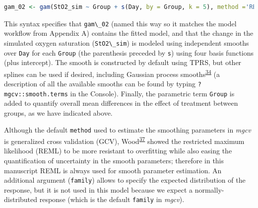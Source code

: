\documentclass[
]{article}
\newcommand{\passthrough}[1]{#1}
\begin{document}
\begin{lstlisting}[language=R]
gam_02 <- gam(StO2_sim ~ Group + s(Day, by = Group, k = 5), method ='REML', data = dat_sim)
\end{lstlisting}

This syntax specifies that \passthrough{\lstinline!gam\_02!} (named this way so it matches the model workflow from Appendix A) contains the fitted model, and that the change in the simulated oxygen saturation (\passthrough{\lstinline!StO2\_sim!}) is modeled using independent smooths over \passthrough{\lstinline!Day!} for each \passthrough{\lstinline!Group!} (the parenthesis preceded by \passthrough{\lstinline!s!}) using four basis functions (plus intercept). The smooth is constructed by default using TPRS, but other splines can be used if desired, including Gaussian process smooths\textsuperscript{\protect\hyperlink{ref-simpson2018}{34}} (a description of all the available smooths can be found by typing \passthrough{\lstinline!?mgcv::smooth.terms!} in the Console). Finally, the parametric term \passthrough{\lstinline!Group!} is added to quantify overall mean differences in the effect of treatment between groups, as we have indicated above.

Although the default \passthrough{\lstinline!method!} used to estimate the smoothing parameters in \emph{mgcv} is generalized cross validation (GCV), Wood\textsuperscript{\protect\hyperlink{ref-wood2017}{37}} showed the restricted maximum likelihood (REML) to be more resistant to overfitting while also easing the quantification of uncertainty in the smooth parameters; therefore in this manuscript REML is always used for smooth parameter estimation. An additional argument (\passthrough{\lstinline!family!}) allows to specify the expected distribution of the response, but it is not used in this model because we expect a normally-distributed response (which is the default \passthrough{\lstinline!family!} in \emph{mgcv}).
\end{document}
